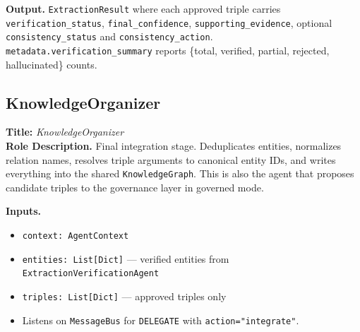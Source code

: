 \documentclass{article}
\begin{document}
\begin{agentbox}
\textbf{Output.} \texttt{ExtractionResult} where each approved triple carries \texttt{verification\_status}, \texttt{final\_confidence}, \texttt{supporting\_evidence}, optional \texttt{consistency\_status} and \texttt{consistency\_action}. \texttt{metadata.verification\_summary} reports \{total, verified, partial, rejected, hallucinated\} counts.
\end{agentbox}

\newpage
\subsection{KnowledgeOrganizer}
\label{app:knowledge_organizer}

\begin{agentbox}
\textbf{Title:} \textit{KnowledgeOrganizer}\\
\textbf{Role Description.} Final integration stage. Deduplicates
entities, normalizes relation names, resolves triple arguments to
canonical entity IDs, and writes everything into the shared
\texttt{KnowledgeGraph}. This is also the agent that proposes
candidate triples to the governance layer in governed mode.

\textbf{Inputs.}
\begin{itemize}[leftmargin=*,nosep]
\item \texttt{context: AgentContext}
\item \texttt{entities: List[Dict]} --- verified entities from \texttt{ExtractionVerificationAgent}
\item \texttt{triples: List[Dict]} --- approved triples only
\item Listens on \texttt{MessageBus} for \texttt{DELEGATE} with \texttt{action="integrate"}.
\end{itemize}


\end{agentbox}
\end{document}
